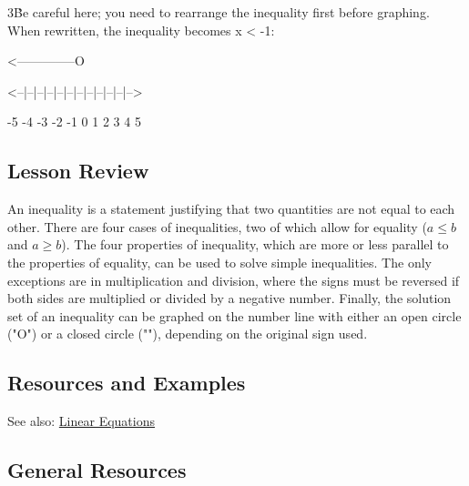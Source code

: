 3\. Be careful here; you need to rearrange the inequality first before graphing. When
rewritten, the inequality becomes x < -1:



                        <--------------O

                        <--|--|--|--|--|--|--|--|--|--|--|-->

                          -5 -4 -3 -2 -1  0  1  2  3  4  5




\subsection{Lesson Review}
\label{sss:less-de45}




An inequality is a statement justifying that two quantities are not equal to each other.
There are four cases of inequalities, two of which allow for equality ($a \le b$ and $a
\ge b$). The four properties of inequality, which are more or less parallel to the
properties of equality, can be used to solve simple inequalities. The only exceptions are
in multiplication and division, where the signs must be reversed if both sides are
multiplied or divided by a negative number. Finally, the solution set of an inequality can
be graphed on the number line with either an open circle ("O") or a closed circle ("\*"),
depending on the original sign used.




\subsection{Resources and Examples}
\label{sss:reso-a390}




See also: \href{Linear_Equations "wikilink"}{Linear Equations}




\subsection{General Resources}
\label{sss:gene-4867}





